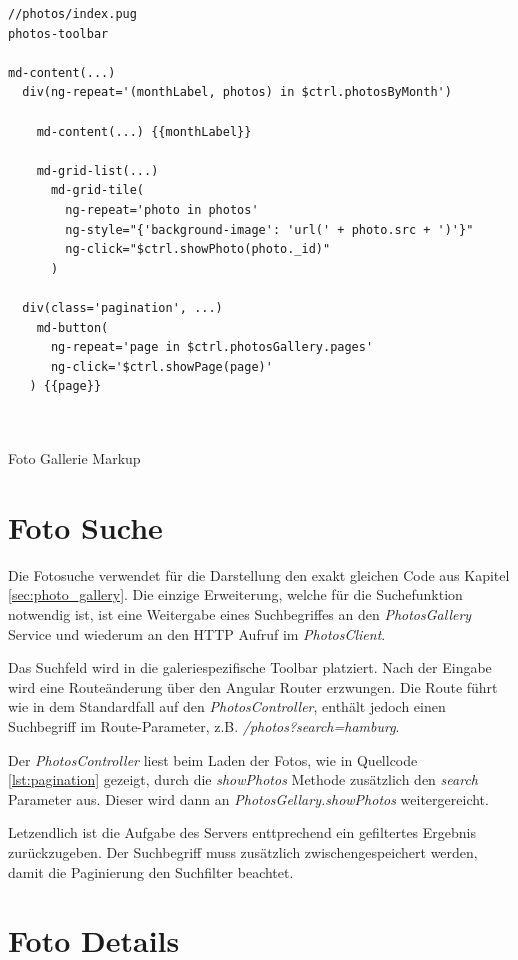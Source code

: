 \begin{listing}[H]
\begin{verbatim}
//photos/index.pug
photos-toolbar

md-content(...)
  div(ng-repeat='(monthLabel, photos) in $ctrl.photosByMonth')

    md-content(...) {{monthLabel}}

    md-grid-list(...)
      md-grid-tile(
        ng-repeat='photo in photos'
        ng-style="{'background-image': 'url(' + photo.src + ')'}"
        ng-click="$ctrl.showPhoto(photo._id)"
      )

  div(class='pagination', ...)
    md-button(
      ng-repeat='page in $ctrl.photosGallery.pages'
      ng-click='$ctrl.showPage(page)'
   ) {{page}}



\end{verbatim}
\caption{Foto Gallerie Markup}
\label{lst:photo_group_jade}
\end{listing}

\section{Foto Suche}

Die Fotosuche verwendet für die Darstellung den exakt gleichen Code aus Kapitel \ref{sec:photo_gallery}. Die einzige Erweiterung, welche für die Suchefunktion notwendig ist, ist eine Weitergabe eines Suchbegriffes an den \emph{PhotosGallery} Service und wiederum an den HTTP Aufruf im \emph{PhotosClient}.

Das Suchfeld wird in die galeriespezifische Toolbar platziert. Nach der Eingabe wird eine Routeänderung über den Angular Router erzwungen. Die Route führt wie in dem Standardfall auf den \emph{PhotosController}, enthält jedoch einen Suchbegriff im Route-Parameter, z.B. \emph{/photos?search=hamburg}.

Der \emph{PhotosController} liest beim Laden der Fotos, wie in Quellcode \ref{lst:pagination} gezeigt, durch die \emph{showPhotos} Methode zusätzlich den
\emph{search} Parameter aus. Dieser wird dann an \emph{PhotosGellary.showPhotos} weitergereicht.

Letzendlich ist die Aufgabe des Servers enttprechend ein gefiltertes Ergebnis zurückzugeben. Der Suchbegriff muss zusätzlich zwischengespeichert werden, damit die Paginierung den Suchfilter beachtet.

\section{Foto Details}
\label{sec:photo_details}

